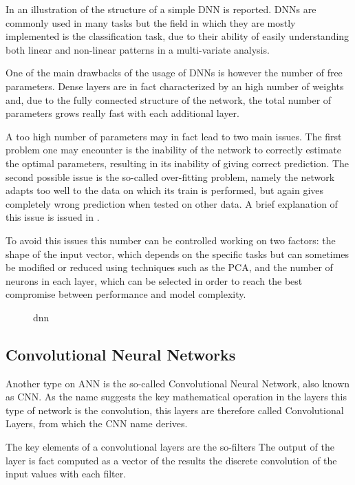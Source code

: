In  an illustration of the structure of a simple DNN is reported. DNNs are commonly used in many tasks but the field in which they are mostly implemented is the classification task, due to their ability of easily understanding both linear and non-linear patterns in a multi-variate analysis.

One of the main drawbacks of the usage of DNNs is however the number of free parameters. Dense layers are in fact characterized by an high number of weights and, due to the fully connected structure of the network, the total number of parameters grows really fast with each additional layer. 

A too high number of parameters may in fact lead to two main issues. The first problem one may encounter is the inability of the network to correctly estimate the optimal parameters, resulting in its inability of giving correct prediction. The second possible issue is the so-called over-fitting problem, namely the network adapts too well to the data on which its train is performed, but again gives completely wrong prediction when tested on other data. A brief explanation of this issue is issued in .

To avoid this issues this number can be controlled working on two factors: the shape of the input vector, which depends on the specific tasks but can sometimes be modified or reduced using techniques such as the PCA, and the number of neurons in each layer, which can be selected in order to reach the best compromise between performance and model complexity.



\begin{figure}
    \centering
    \caption{dnn}
    \label{fig:dnn_example}
\end{figure}


\subsection{Convolutional Neural Networks}\label{cnn}

Another type on ANN is the so-called Convolutional Neural Network, also known as CNN. As the name suggests the key mathematical operation in the layers this type of network is the convolution, this layers are therefore called Convolutional Layers, from which the CNN name derives.

The key elements of a convolutional layers are the so-filters The output of the layer is fact computed as a vector of the results the discrete convolution of the input values with each filter. 

